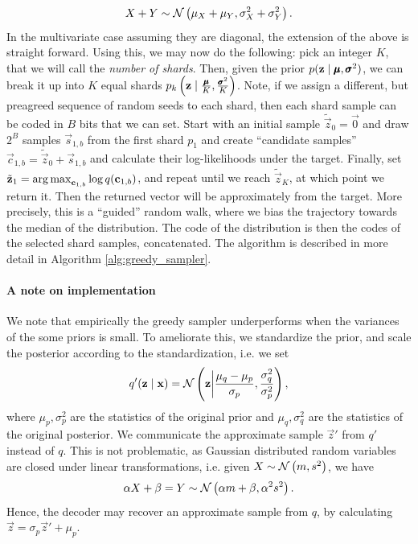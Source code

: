 \[
  X + Y \sim \mathcal{N}\left( \mu_X + \mu_Y, \sigma_X^2 + \sigma_Y^2 \right).
\]
In the multivariate case assuming they are diagonal, the extension of
the above is straight forward.
Using this, we may now do the following: pick an integer $K$, that
we will call the \textit{number of shards}. Then, given the prior
$p(\mathbf{z} \mid \pmb{\mu}, \pmb{\sigma}^2)$, we can break it up into $K$ equal
shards $p_k\left(\mathbf{z} \mid \frac{\pmb{\mu}}{K}, \frac{\pmb{\sigma}^2}{K}\right)$.
Note, if we assign a different, but preagreed sequence of random seeds to each
shard, then each shard sample can be coded in $B$ bits that we can set. Start
with an initial sample $\tilde{\vec{z}}_0 = \vec{0}$ and draw $2^B$
samples $\vec{s}_{1, b}$ from the first shard $p_1$ and create
``candidate samples'' $\vec{c}_{1, b} =
\tilde{\vec{z}}_0 + \vec{s}_{1, b}$ and calculate their log-likelihoods under the
target. Finally, set $\tilde{\mathbf{z}}_1 = \operatorname*{arg\,max}_{\mathbf{c}_{1, b}}\log
q(\mathbf{c}_{1, b})$, and repeat until we reach $\tilde{\vec{z}}_K$, at which
point we return it. Then the returned vector will be approximately from the
target. More precisely, this is a ``guided'' random walk, where we bias the
trajectory towards the median of the distribution. The code of the distribution
is then the codes of the selected shard samples, concatenated. The algorithm is described in
more detail in Algorithm \ref{alg:greedy_sampler}. 

\paragraph{A note on implementation}
We note that empirically the greedy sampler underperforms when the variances of the
some priors is small. To ameliorate this, we standardize the prior, and scale the
posterior according to the standardization, i.e. we set 
\[
  q'(\mathbf{z} \mid \mathbf{x}) = \mathcal{N}\left( \mathbf{z} \bigg| \frac{\mu_q -
      \mu_p}{\sigma_p}, \frac{\sigma^2_{q}}{\sigma^2_{p}} \right),
\]
where $\mu_p, \sigma^2_p$ are the statistics of the original prior and $\mu_q,
\sigma^2_q$ are the statistics of the original posterior. We communicate the
approximate sample $\vec{z}'$ from $q'$ instead of $q$. This is not problematic, as
Gaussian distributed random variables are closed under linear transformations,
i.e. given $X \sim \mathcal{N}\left( m, s^2 \right)$, we have
\[
  \alpha X + \beta = Y \sim \mathcal{N}\left( \alpha m + \beta, \alpha^2 s^2 \right).
\]
Hence, the decoder may recover an approximate sample from $q$, by calculating
$\vec{z} = \sigma_{p} \vec{z}' + \mu_{p}$.
